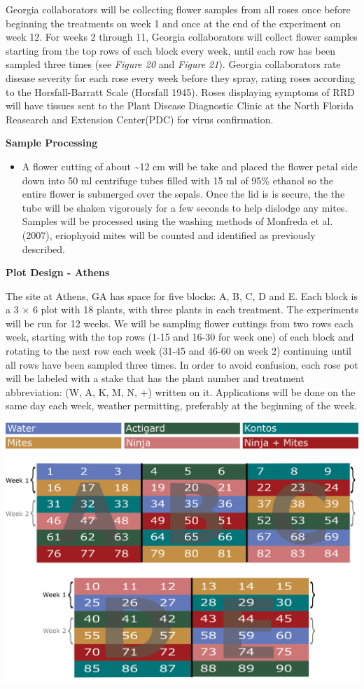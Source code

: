 \documentclass[12pt,final,CPage]{ufthesis}
\begin{document}
{  Georgia collaborators will be collecting flower samples from all roses once before beginning the treatments on week 1 and once at the end of the experiment on week 12. For weeks 2 through 11, Georgia collaborators will collect flower samples starting from the top rows of each block every week, until each row has been sampled three times (see \emph{Figure 20} and \emph{Figure 21}). Georgia collaborators rate disease severity for each rose every week before they spray, rating roses according to the Horsfall-Barratt Scale (Horsfall 1945). Roses displaying symptoms of RRD will have tissues sent to the Plant Disease Diagnostic Clinic at the North Florida Reasearch and Extension Center(PDC) for virus confirmation.

  \textbf{Sample Processing}
  \begin{itemize}
  \tightlist
  \item
    A flower cutting of about \textasciitilde12 cm will be take and placed the flower petal side down into 50 ml centrifuge tubes filled with 15 ml of 95\% ethanol so the entire flower is submerged over the sepals. Once the lid is is secure, the the tube will be shaken vigorously for a few seconds to help dislodge any mites. Samples will be processed using the washing methods of Monfreda et al. (2007), eriophyoid mites will be counted and identified as previously described.
  \end{itemize}
  \textbf{Plot Design - Athens}

  The site at Athens, GA has space for five blocks: A, B, C, D and E. Each block is a 3 \(\times\) 6 plot with 18 plants, with three plants in each treatment. The experiments will be run for 12 weeks. We will be sampling flower cuttings from two rows each week, starting with the top rows (1-15 and 16-30 for week one) of each block and rotating to the next row each week (31-45 and 46-60 on week 2) continuing until all rows have been sampled three times. In order to avoid confusion, each rose pot will be labeled with a stake that has the plant number and treatment abbreviation: (W, A, K, M, N, +) written on it. Applications will be done on the same day each week, weather permitting, preferably at the beginning of the week.
  \begin{center}\includegraphics[width=0.8\linewidth]{figure/rrv_ipm_plot_map_2019_athens} \end{center}

}
\end{document}
